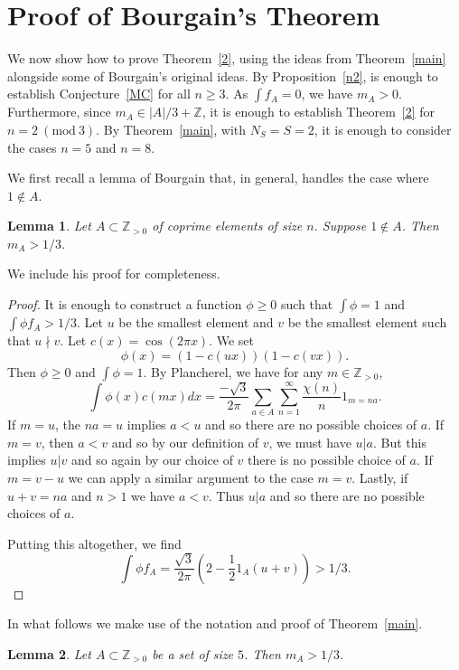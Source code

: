 \documentclass[12pt,reqno]{amsart}
\theoremstyle{dotless}
\newtheorem{lemma}{Lemma}
\newcommand{\Mod}[1]{\ (\mathrm{mod}\ #1)}
\begin{document}
\section{Proof of Bourgain's Theorem}\label{sec4}

We now show how to prove Theorem~\ref{2}, using the ideas from Theorem~\ref{main} alongside some of Bourgain's original ideas.  By Proposition~\ref{n2}, is enough to establish Conjecture~\ref{MC} for all $n \geq 3$.
As $\int f_A = 0$, we have $m_A > 0$. Furthermore, since $m_A \in |A|/3 + \mathbb{Z}$, it is enough to establish Theorem~\ref{2} for  $n = 2 \Mod 3$.  By Theorem~\ref{main}, with $N_S = S = 2$, it is enough to consider the cases $n=5$ and $n=8$. 

We first recall a lemma of Bourgain that, in general, handles the case where $1 \notin A$.

\begin{lemma}\label{1inA} Let $A \subset \mathbb{Z}_{>0}$ of coprime elements of size $n$. Suppose $1 \notin A$. Then $m_A > 1/3$.
\end{lemma}

We include his proof for completeness. 
\begin{proof}
It is enough to construct a function $\phi \geq 0$ such that $\int \phi =1$ and $\int \phi f_A > 1/3$. Let $u$ be the smallest element and $v$ be the smallest element such that $u \nmid v$. Let $c(x) = \cos(2\pi x)$. We set 
$$\phi(x) = (1 - c(ux))(1 - c(vx)).$$
Then $\phi \geq 0$ and $\int \phi = 1$. By Plancherel, we have for any $m \in \mathbb{Z}_{>0}$, 
$$\int \phi(x) c(mx) dx =\frac{-\sqrt{3}}{2\pi} \sum_{a \in A} \sum_{n=1}^{\infty}\frac{\chi(n)}{n} 1_{m = na}.$$
If $m = u$, the $na = u$ implies $a < u$ and so there are no possible choices of $a$. If $m = v$, then $a < v$ and so by our definition of $v$, we must have $u | a$. But this implies $u|v$ and so again by our choice of $v$ there is no possible choice of $a$. If $m = v- u$ we can apply a similar argument to the case $m = v$. Lastly, if $u+v = na$ and $n > 1$ we have $a < v$. Thus $u |a$ and so there are no possible choices of $a$. 

Putting this altogether, we find
$$\int \phi f_A = \frac{\sqrt{3}}{2\pi} (2 - \frac{1}{2} 1_A(u+v)) > 1/3.$$
\end{proof}

In what follows we make use of the notation and proof of Theorem~\ref{main}.

\begin{lemma}\label{5}
Let $A \subset\mathbb{Z}_{>0}$ be a set of size $5$. Then $m_A > 1/3$.
\end{lemma}
\end{document}

